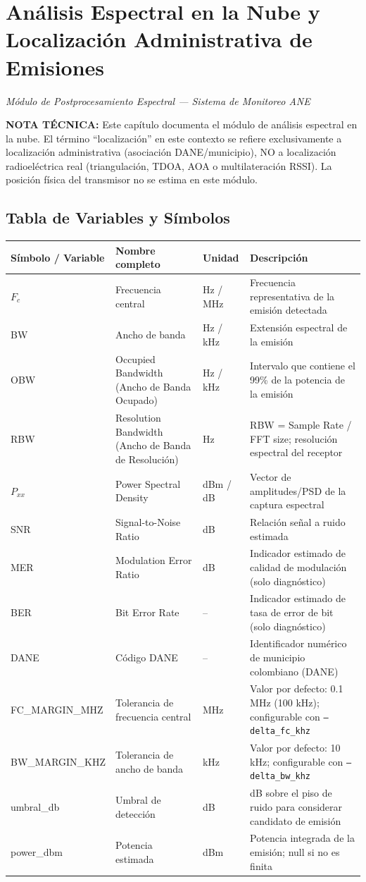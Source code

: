 \chapter*{Análisis Espectral en la Nube y Localización Administrativa de Emisiones}

\textit{Módulo de Postprocesamiento Espectral — Sistema de Monitoreo ANE}

\textbf{NOTA TÉCNICA:} Este capítulo documenta el módulo de análisis espectral en la nube. El término ``localización'' en este contexto se refiere exclusivamente a localización administrativa (asociación DANE/municipio), NO a localización radioeléctrica real (triangulación, TDOA, AOA o multilateración RSSI). La posición física del transmisor no se estima en este módulo.

\section*{Tabla de Variables y Símbolos}
\begin{tabular}{p{3cm}p{4.5cm}p{2cm}p{6cm}}
\textbf{Símbolo / Variable} & \textbf{Nombre completo} & \textbf{Unidad} & \textbf{Descripción} \\
\hline
$F_c$ & Frecuencia central & Hz / MHz & Frecuencia representativa de la emisión detectada \\
BW & Ancho de banda & Hz / kHz & Extensión espectral de la emisión \\
OBW & Occupied Bandwidth (Ancho de Banda Ocupado) & Hz / kHz & Intervalo que contiene el 99\% de la potencia de la emisión \\
RBW & Resolution Bandwidth (Ancho de Banda de Resolución) & Hz & RBW = Sample Rate / FFT size; resolución espectral del receptor \\
$P_{xx}$ & Power Spectral Density & dBm / dB & Vector de amplitudes/PSD de la captura espectral \\
SNR & Signal-to-Noise Ratio & dB & Relación señal a ruido estimada \\
MER & Modulation Error Ratio & dB & Indicador estimado de calidad de modulación (solo diagnóstico) \\
BER & Bit Error Rate & -- & Indicador estimado de tasa de error de bit (solo diagnóstico) \\
DANE & Código DANE & -- & Identificador numérico de municipio colombiano (DANE) \\
FC\_MARGIN\_MHZ & Tolerancia de frecuencia central & MHz & Valor por defecto: 0.1 MHz (100 kHz); configurable con \texttt{--delta\_fc\_khz} \\
BW\_MARGIN\_KHZ & Tolerancia de ancho de banda & kHz & Valor por defecto: 10 kHz; configurable con \texttt{--delta\_bw\_khz} \\
umbral\_db & Umbral de detección & dB & dB sobre el piso de ruido para considerar candidato de emisión \\
power\_dbm & Potencia estimada & dBm & Potencia integrada de la emisión; null si no es finita \\
\end{tabular}

